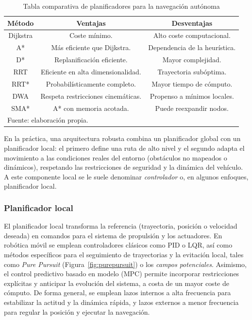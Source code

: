     \begin{table}[H]
        
        {\caption{Tabla comparativa de planificadores para la navegación autónoma}
        \label{tab:planners_summary}}
        {%
        \begin{tabularx}{0.896\textwidth}{|c|c|c|}
            \hline
            \textbf{Método} & \textbf{Ventajas} & \textbf{Desventajas} \\
            \hline
            Dijkstra & Coste mínimo. & Alto coste computacional. \\
            \hline
            A* & Más eficiente que Dijkstra. & Dependencia de la heurística. \\
            \hline
            D* & Replanificación eficiente. & Mayor complejidad. \\
            \hline
            RRT & Eficiente en alta dimensionalidad. & Trayectoria subóptima. \\
            \hline
            RRT* & Probabilísticamente completo. & Mayor tiempo de cómputo. \\
            \hline
            DWA & Respeta restricciones cinemáticas. & Propenso a mínimos locales. \\
            \hline
            SMA* & A* con memoria acotada. & Puede reexpandir nodos. \\
            \hline
            \multicolumn{3}{l}{Fuente: elaboración propia.} \\
        \end{tabularx}%
        }
    \end{table}

    En la práctica, una arquitectura robusta combina un planificador global con un planificador local: el primero define una ruta de alto
    nivel y el segundo adapta el movimiento a las condiciones reales del entorno (obstáculos no mapeados o dinámicos), respetando las
    restricciones de seguridad y la dinámica del vehículo. A este componente local se le suele denominar \textit{controlador} o, en algunos
    enfoques, planificador local.

    \subsubsection*{Planificador local}
    El planificador local transforma la referencia (trayectoria, posición o velocidad deseada) en comandos para el sistema de propulsión y los
    actuadores. En robótica móvil se emplean controladores clásicos como PID o LQR, así como métodos específicos para el seguimiento de
    trayectorias y la evitación local, tales como \textit{Pure Pursuit} (Figura~\ref{fig:purepursuit}) o los \textit{campos potenciales}. Asimismo, el control predictivo
    basado en modelo (MPC) permite incorporar restricciones explícitas y anticipar la evolución del sistema, a costa de un mayor coste de
    cómputo. De forma general, se emplean lazos internos a alta frecuencia para estabilizar la actitud y la dinámica rápida, y lazos externos a
    menor frecuencia para regular la posición y ejecutar la navegación.

